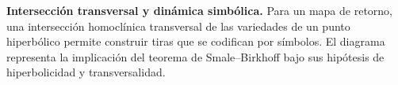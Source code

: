 \begin{center}
\begin{minipage}{\linewidth}
\smallskip
\begin{minipage}{0.92\linewidth}
\small\textbf{Intersección transversal y dinámica simbólica.}
Para un mapa de retorno, una intersección homoclínica transversal de las
variedades de un punto hiperbólico permite construir tiras que se codifican por
símbolos. El diagrama representa la implicación del teorema de
Smale--Birkhoff bajo sus hipótesis de hiperbolicidad y transversalidad.
\end{minipage}
\end{minipage}
\end{center}

